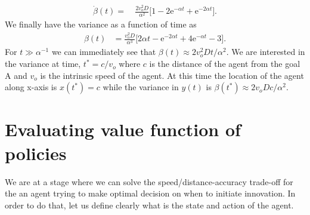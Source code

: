 \documentclass[12pt]{article}
\def\e{\text{e}}
\def\yd{\dot{y}}
\begin{document}
\begin{align}
    \dot{\beta}(t) = & \  \frac{2 v_o^2 D}{\alpha^2} \bigg[ 1 - 2 \e^{-\alpha t} + \e^{-2 \alpha t}\bigg].
\end{align}
We finally have the variance as a function of time as
\begin{align}
    \beta(t) & = \frac{v_o^2 D}{\alpha^3} \bigg[ 2 \alpha t - \e^{-2 \alpha t} + 4 \e^{-\alpha t} - 3 \bigg].
\end{align}
For $t \gg \alpha^{-1}$ we can immediately see that $\beta(t) \approx 2v_o^2 D t/\alpha^2$. We are interested
in the variance at time, $t^* = c/v_o$ where $c$ is the distance of the agent from the goal A and $v_o$
is the intrinsic speed of the agent. At this time the location of the agent along x-axis is $x(t^*)=c$
while the variance in $y(t)$ is $\beta(t^*) \approx 2v_o D c/\alpha^2$.

\section{Evaluating value function of policies}
We are at a stage where we can solve the speed/distance-accuracy trade-off for the an agent trying
to make optimal decision on when to initiate innovation. In order to do that, let us define clearly
what is the state and action of the agent.
\end{document}
